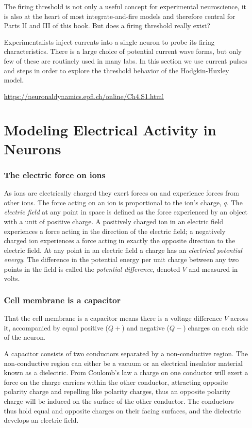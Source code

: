 The firing threshold is not only a useful concept for experimental neuroscience, it is also at the heart of most integrate-and-fire models and therefore central for Parts II and III of this book. But does a firing threshold really exist?

Experimentalists inject currents into a single neuron to probe its firing characteristics. There is a large choice of potential current wave forms, but only few of these are routinely used in many labs. In this section we use current pulses and steps in order to explore the threshold behavior of the Hodgkin-Huxley model.

\url{https://neuronaldynamics.epfl.ch/online/Ch4.S1.html}

\section{Modeling Electrical Activity in Neurons}

\subsubsection{The electric force on ions}

As ions are electrically charged they exert forces on and experience forces from other ions. The force acting on an ion is proportional to the ion’s charge, $q$. The \textit{electric field} at any point in space is defined as the force experienced by an object with a unit of positive charge. A positively charged ion in an electric field experiences a force acting in the direction of the electric field; a negatively charged ion experiences a force acting in exactly the opposite direction to the electric field. At any point in an electric field a charge has an \textit{electrical potential energy}. The difference in the potential energy per unit charge between any two points in the field is called the \textit{potential difference}, denoted $V$ and measured in volts.

\subsubsection{Cell membrane is a capacitor} 

That the cell membrane is a capacitor means there is a voltage difference $V$ across it, accompanied by equal positive ($Q+$) and negative ($Q-$) charges on each side of the neuron. 

A capacitor consists of two conductors separated by a non-conductive region. The non-conductive region can either be a vacuum or an electrical insulator material known as a dielectric. From Coulomb's law a charge on one conductor will exert a force on the charge carriers within the other conductor, attracting opposite polarity charge and repelling like polarity charges, thus an opposite polarity charge will be induced on the surface of the other conductor. The conductors thus hold equal and opposite charges on their facing surfaces, and the dielectric develops an electric field.

